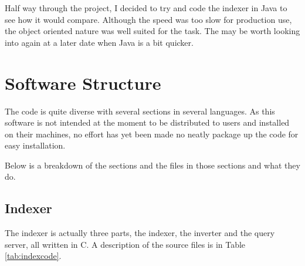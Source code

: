 Half way through the project, I decided to try and code the indexer in Java to see how it would compare.  Although the speed was too slow for production use, the object oriented nature was well suited for the task.  The may be worth looking into again at a later date when Java is a bit quicker.

\section{Software Structure}

The code is quite diverse with several sections in several languages.  As this software is not intended at the moment to be distributed to users and installed on their machines, no effort has yet been made no neatly package up the code for easy installation.

Below is a breakdown of the sections and the files in those sections and what they do.

\subsection{Indexer}
The indexer is actually three parts, the indexer, the inverter and the query server, all written in C.  A description of the source files is in Table \ref{tab:indexcode}.  



